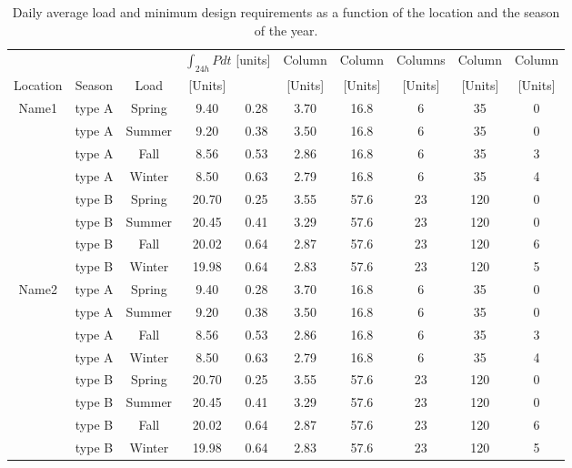 \documentclass[journal, twoside]{IEEEtran}
\begin{document}
      
      
\begin{table}[h]
\caption{Daily average load and  minimum design requirements as a function of the location and the season of the year.}
\label{table_minimumsurface}
\centering
\resizebox{18cm}{!} {
\begin{tabular}{cccccccccc}
\hline
\hline
	&		&		&		\multicolumn{2}{c}{$\int_{24h} P dt$\hspace{2mm} [units]}	& Column	&	Column &	Columns	&	Column	&	Column 		\\
Location	&	Season	&	Load	&[Units]	&		& [Units]	&  [Units]	&	 [Units]&	[Units] 	&	[Units] \\
\hline
Name1	&	type A	&	Spring	&	9.40	&	0.28	&	3.70	&	16.8	&	6	&	35	&	0	\\
	&	type A	&	Summer	&	9.20	&	0.38	&	3.50	&	16.8	&	6	&	35	&	0	\\
	&	type A	&	Fall	&	8.56	&	0.53	&	2.86	&	16.8	&	6	&	35	&	3	\\
	&	type A	&	Winter	&	8.50	&	0.63	&	2.79	&	16.8	&	6	&	35	&	4	\\
	&	type B	&	Spring	&	20.70	&	0.25	&	3.55	&	57.6	&	23	&	120	&	0	\\
	&	type B	&	Summer	&	20.45	&	0.41	&	3.29	&	57.6	&	23	&	120	&	0	\\
	&	type B	&	Fall	&	20.02	&	0.64	&	2.87	&	57.6	&	23	&	120	&	6	\\
	&	type B	&	Winter	&	19.98	&	0.64	&	2.83	&	57.6	&	23	&	120	&	5	\\
	Name2	&	type A	&	Spring	&	9.40	&	0.28	&	3.70	&	16.8	&	6	&	35	&	0	\\
	&	type A	&	Summer	&	9.20	&	0.38	&	3.50	&	16.8	&	6	&	35	&	0	\\
	&	type A	&	Fall	&	8.56	&	0.53	&	2.86	&	16.8	&	6	&	35	&	3	\\
	&	type A	&	Winter	&	8.50	&	0.63	&	2.79	&	16.8	&	6	&	35	&	4	\\
	&	type B	&	Spring	&	20.70	&	0.25	&	3.55	&	57.6	&	23	&	120	&	0	\\
	&	type B	&	Summer	&	20.45	&	0.41	&	3.29	&	57.6	&	23	&	120	&	0	\\
	&	type B	&	Fall	&	20.02	&	0.64	&	2.87	&	57.6	&	23	&	120	&	6	\\
	&	type B	&	Winter	&	19.98	&	0.64	&	2.83	&	57.6	&	23	&	120	&	5	\\
\hline
\hline
\end{tabular}}
\end{table}
      
      
      
\end{document}
